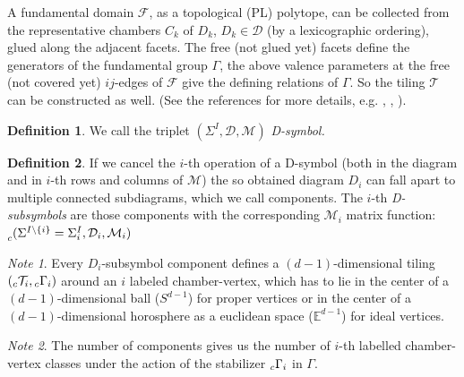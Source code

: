 \documentclass[12pt,a4paper]{article}
\numberwithin{equation}{section}
\newcommand{\leftsub}[2]{{\vphantom{#2}}_{#1}{#2}}
\theoremstyle{plain}%
\theoremstyle{definition}
\newtheorem{defn}{Definition}[section]
\theoremstyle{remark}
\newtheorem*{note}{Note}
\begin{document}
A fundamental domain $\mathcal{F}$, as a topological (PL) polytope, can be collected
from the representative chambers $C_k$ of $D_k$, $D_k\in\mathcal{D}$ (by a
lexicographic ordering), glued along the adjacent facets. The free (not glued
yet) facets define the generators of the fundamental group $\Gamma$, the above
valence parameters at the free (not covered yet) $ij$-edges of $\mathcal{F}$
give the defining relations of $\Gamma$. So the tiling $\mathcal{T}$ can be
constructed as well. (See the references for more details,
e.g. \cite{DHM93}, \cite{M96}, \cite{M11}).

\begin{defn}
  We call the triplet $(\Sigma^I,\mathcal{D},\mathcal{M})$ {\em D-symbol.}
\end{defn}


\begin{defn}
  If we cancel the $i$-th operation of a D-symbol (both in the diagram and in
  $i$-th rows and columns of $\mathcal{M}$) the so obtained diagram $D_i$ can fall apart to multiple
  connected subdiagrams, which we call components. The $i$-th {\em D-subsymbols} are
  those components with the corresponding $\mathcal{M}_i$ matrix function:
  $\leftsub{c}{(\Sigma^{I\setminus\{i\}}=\Sigma^I_i,\mathcal{D}_i,\mathcal{M}_i)}$
\end{defn}

\begin{note}
  Every $D_i$-subsymbol component defines a $(d-1)$-dimensional tiling
  $(\leftsub{c}{\mathcal{T}}_i,\leftsub{c}{\Gamma}_i)$ around an $i$ labeled chamber-vertex, which has to lie
  in the center of a $(d-1)$-dimensional ball ($S^{d-1}$) for proper vertices or
  in the center of a $(d-1)$-dimensional horosphere as a
  euclidean space ($\mathbb{E}^{d-1}$) for ideal vertices.
\end{note}

\begin{note}
  The number of components gives us the number of $i$-th labelled chamber-vertex
  classes under the action of the stabilizer $\leftsub{c}{\Gamma}_i$ in $\Gamma$.
\end{note}
\end{document}
